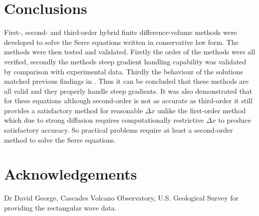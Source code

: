\documentclass[SingleSpace,12pt,Proceedings]{Serre_ASCE}
\begin{document}
\section{Conclusions}
\label{section:Conclusions}
First-, second- and third-order hybrid finite difference-volume methods were developed to solve the Serre equations written in conservative law form. The methods were then tested and validated. Firstly the order of the methods were all verified, secondly the methods steep gradient handling capability was validated by comparison with experimental data. Thirdly the behaviour of the solutions matched previous findings in . Thus it can be concluded that these methods are all valid and they properly handle steep gradients. It was also demonstrated that for these equations although second-order is not as accurate as third-order it still provides a satisfactory method for reasonable $\Delta x$ unlike the first-order method which due to strong diffusion requires computationally restrictive $\Delta x$ to produce satisfactory accuracy. So practical problems require at least a second-order method to solve the Serre equations. 
\newpage
\section{Acknowledgements}
Dr David George, Cascades Volcano Observatory, U.S. Geological Survey for providing the rectangular wave data.



\end{document}
